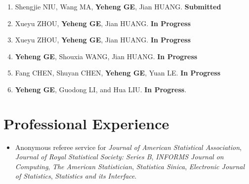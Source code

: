 \documentclass{resume}
\begin{document}
\begin{enumerate}
\item
Shengjie NIU,
Wang MA,
\textbf{Yeheng GE}, 
Jian HUANG.
\textbf{Submitted}





\item 	
Xueyu ZHOU,
\textbf{Yeheng GE},
Jian HUANG.
\textbf{In Progress}





\item 	
Xueyu ZHOU,
\textbf{Yeheng GE},
Jian HUANG.
\textbf{In Progress}



\item 	
\textbf{Yeheng GE},
Shouxia WANG,
Jian HUANG.
\textbf{In Progress}







\item  
Fang CHEN, 
Shuyan CHEN,
\textbf{Yeheng GE},
Yuan LE.
\textbf{In Progress}




\item   
\textbf{Yeheng GE}, 
Guodong LI,
and 
Hua LIU.
\textbf{In Progress}.


\fi
\end{enumerate}


\section{\bf Professional Experience} 

\begin{itemize}
	\item Anonymous referee service for 
		\textit{Journal of American Statistical Association},
		\textit{Journal of Royal Statistical Society: Series B},
		\textit{INFORMS Journal on Computing},
		\textit{The American Statistician},
		\textit{Statistica Sinica},
		\textit{Electronic Journal of Statistics},
		\textit{Statistics and its Interface}.
\end{itemize}
\end{document}
